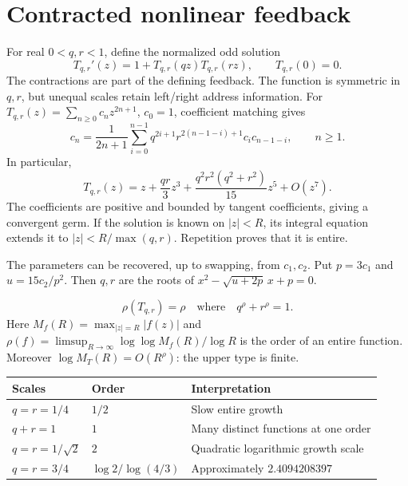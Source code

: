 \documentclass[11pt,oneside,openany]{book}
\begin{document}
\chapter{Contracted nonlinear feedback}\label{ch:feedback}
For real $0<q,r<1$, define the normalized odd solution
\[
\boxed{T_{q,r}'(z)=1+T_{q,r}(qz)T_{q,r}(rz),\qquad T_{q,r}(0)=0.}
\]
The contractions are part of the defining feedback. The function is symmetric
in $q,r$, but unequal scales retain left/right address information.
For $T_{q,r}(z)=\sum_{n\ge0}c_nz^{2n+1}$, $c_0=1$, coefficient matching gives
\[
c_n=\frac{1}{2n+1}\sum_{i=0}^{n-1}
q^{2i+1}r^{2(n-1-i)+1}c_ic_{n-1-i},\qquad n\ge1.
\]
In particular,
\[
T_{q,r}(z)=z+\frac{qr}{3}z^3+
\frac{q^2r^2(q^2+r^2)}{15}z^5+O(z^7).
\]
The coefficients are positive and bounded by tangent coefficients, giving a
convergent germ. If the solution is known on $|z|<R$, its integral equation
extends it to $|z|<R/\max(q,r)$. Repetition proves that it is entire.

The parameters can be recovered, up to swapping, from $c_1,c_2$. Put
$p=3c_1$ and $u=15c_2/p^2$. Then $q,r$ are the roots of
$x^2-\sqrt{u+2p}\,x+p=0$.

\[
\boxed{\rho(T_{q,r})=\rho\quad\text{where}\quad q^\rho+r^\rho=1.}
\]
Here $M_f(R)=\max_{|z|=R}|f(z)|$ and
$\rho(f)=\limsup_{R\to\infty}\log\log M_f(R)/\log R$ is the order of an entire function. Moreover $\log M_{T}(R)=O(R^\rho)$: the upper type is finite.
\begin{tabular}{@{}lll@{}}\toprule
Scales & Order & Interpretation\\\midrule
$q=r=1/4$ & $1/2$ & Slow entire growth\\
$q+r=1$ & $1$ & Many distinct functions at one order\\
$q=r=1/\sqrt2$ & $2$ & Quadratic logarithmic growth scale\\
$q=r=3/4$ & $\log2/\log(4/3)$ & Approximately $2.4094208397$\\
\bottomrule\end{tabular}
\end{document}
